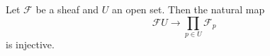 Let $\mathcal{F}$ be a sheaf and $U$ an open set. Then the natural map
\[ \mathcal{F}U \to \prod_{p \in U} \mathcal{F}_p \]
is injective.
